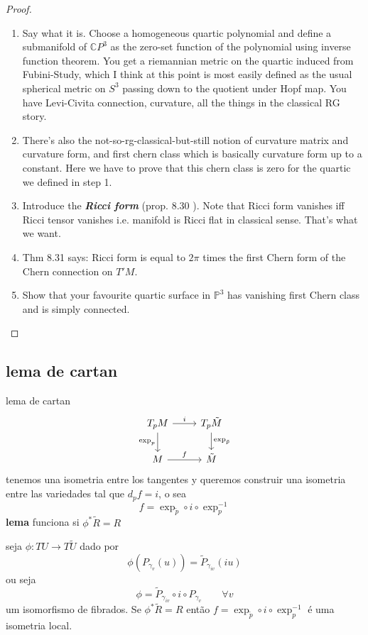 \begin{proof}
\begin{enumerate}[label=\textbf{Step \arabic*}]
\item Say what it is. Choose a homogeneous quartic polynomial and define a submanifold of \(\mathbb{C}P^{3}\) as the zero-set function of the polynomial using inverse function theorem. You get a riemannian metric on the quartic induced from Fubini-Study, which I think at this point is most easily defined as the usual spherical metric on \(S^3\) passing down to the quotient under Hopf map. You have Levi-Civita connection, curvature, all the things in the classical RG story.
\item There's also the not-so-rg-classical-but-still notion of curvature matrix and curvature form, and first chern class which is basically curvature form up to a constant. Here we have to prove that this chern class is zero for the quartic we defined in step 1.
\item Introduce the \textit{\textbf{Ricci form}} (prop. 8.30 \cite{lec}). Note that Ricci form vanishes iff Ricci tensor vanishes i.e. manifold is Ricci flat in classical sense. That's what we want.
\item Thm 8.31 \cite{lec} says: Ricci form is equal to \(2\pi\) times the first Chern form of the Chern connection on \(T'M\).
\item Show that your favourite quartic surface in \(\mathbb{P}^3\) has vanishing first Chern class and is simply connected.
\end{enumerate}
\end{proof}

\subsection{lema de cartan}
\begin{thing6}{lema de cartan}\leavevmode
\[\begin{tikzcd}
	T_pM \arrow[r,"i"]\arrow[d,"\operatorname{exp}_p",swap]&T_p\tilde{M}\arrow[d,"\operatorname{exp}_{\tilde{p}}"]\\
	M\arrow[r,"f"]& \tilde{M}
\end{tikzcd}\]
tenemos una isometria entre los tangentes y queremos construir una isometria entre las variedades tal que \(d_pf=i\), o sea
\[f=\operatorname{exp}_{\tilde{p}}\circ i \circ \operatorname{exp}_p^{-1}\]
\textbf{lema} funciona si \(\phi^*\tilde{R}=R\)

	seja \(\phi:TU \to T\tilde{U}\) dado por
	\[\phi(P_{\gamma_v}(u))=\tilde{P}_{\gamma_{iv}}(iu)\]
	ou seja
	\[\phi=\tilde{P}_{\gamma_{iv}}\circ i \circ P_{\gamma_v} \qquad \forall v\]
	um isomorfismo de fibrados. Se \(\phi^*\tilde{R}=R\) então \(f=\operatorname{exp}_{\tilde{p}}\circ i \circ \operatorname{exp}_p^{-1}\) é uma isometria local.
\end{thing6}

